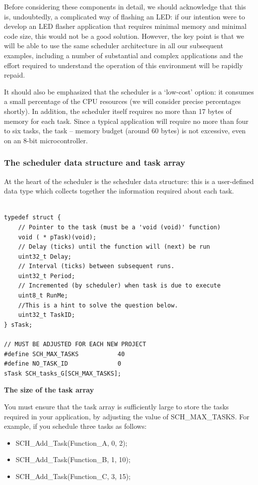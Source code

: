\documentclass[twoside, final]{hcmut_report}
\begin{document}
Before considering these components in detail, we should acknowledge that this is,
undoubtedly, a complicated way of flashing an LED: if our intention were to develop
an LED flasher application that requires minimal memory and minimal code size,
this would not be a good solution. However, the key point is that we will be able to
use the same scheduler architecture in all our subsequent examples, including a
number of substantial and complex applications and the effort required to understand the operation of this environment will be rapidly repaid.

It should also be emphasized that the scheduler is a ‘low-cost’ option: it consumes
a small percentage of the CPU resources (we will consider precise percentages shortly).
In addition, the scheduler itself requires no more than 17 bytes of memory for each
task. Since a typical application will require no more than four to six tasks, the task –
memory budget (around 60 bytes) is not excessive, even on an 8-bit microcontroller.

\subsubsection{The scheduler data structure and task array}
At the heart of the scheduler is the scheduler data structure: this is a user-defined data
type which collects together the information required about each task.

\begin{lstlisting}[basicstyle=\small, caption=A struct of a task]

typedef struct {
    // Pointer to the task (must be a 'void (void)' function)
	void ( * pTask)(void);
	// Delay (ticks) until the function will (next) be run
	uint32_t Delay;
	// Interval (ticks) between subsequent runs.
	uint32_t Period;
	// Incremented (by scheduler) when task is due to execute
	uint8_t RunMe;
	//This is a hint to solve the question below.
	uint32_t TaskID;
} sTask;

// MUST BE ADJUSTED FOR EACH NEW PROJECT
#define SCH_MAX_TASKS 			40
#define	NO_TASK_ID				0
sTask SCH_tasks_G[SCH_MAX_TASKS];
\end{lstlisting}

\textbf{The size of the task array}

You must ensure that the task array is sufficiently large to store the tasks required in
your application, by adjusting the value of SCH\_MAX\_TASKS.
For example, if you schedule three tasks as follows:
\begin{itemize}
    \item SCH\_Add\_Task(Function\_A, 0, 2);
    \item SCH\_Add\_Task(Function\_B, 1, 10);
    \item SCH\_Add\_Task(Function\_C, 3, 15);
\end{itemize}
\end{document}
